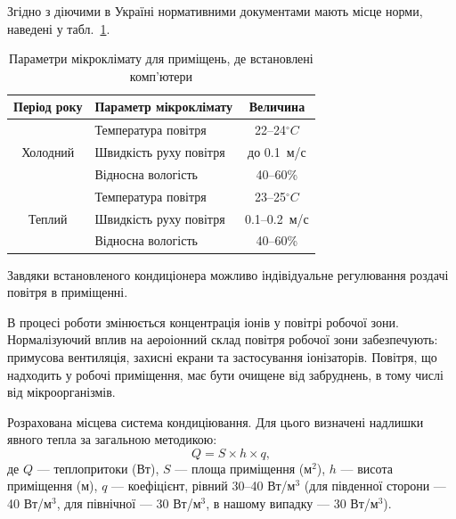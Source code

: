 \documentclass[simple,14pt,utf8,ukrainian]{eskdtext}
\begin{document}
      Згідно з діючими в Україні нормативними документами\cite{gost121005}
      мають місце норми, наведені у табл.~\ref{tab:microclimat}.
      \begin{table}[h]
        \centering
        \begin{tabular}{|c|l|c|}
          \hline
            Період року & Параметр мікроклімату & Величина\\
          \hline
            \multirow{3}{*}{Холодний} & Температура повітря &
            \num{22}--\num{24}$^\circ C$\\
          \cline{2-3}
            & Швидкість руху повітря & до \num{0.1}~м/с\\
          \cline{2-3}
            & Відносна вологість & \num{40}--\num{60}\%\\
          \hline
            \multirow{3}{*}{Теплий} & Температура повітря &
            \num{23}--\num{25}$^\circ C$\\
          \cline{2-3}
            & Швидкість руху повітря & \num{0.1}--\num{0.2}~м/с\\
          \cline{2-3}
            & Відносна вологість & \num{40}--\num{60}\%\\
          \hline
        \end{tabular}
        \caption{Параметри мікроклімату для приміщень, де встановлені
        комп’ютери}
        \label{tab:microclimat}
      \end{table}

      Завдяки встановленого кондиціонера можливо індівідуальне регулювання
      роздачі повітря в приміщенні.

      В процесі роботи змінюється концентрація іонів у повітрі робочої зони.
      Нормалізуючий вплив на аероіонний склад повітря робочої зони
      забезпечують: примусова вентиляція, захисні екрани та застосування
      іонізаторів.
      Повітря, що надходить у робочі приміщення, має бути очищене від
      забруднень, в тому числі від мікроорганізмів.

      Розрахована місцева система кондиціювання. Для цього визначені надлишки
      явного тепла за загальною методикою:
      \begin{equation}
        Q = S \times h \times q,
        \label{eq:nadlishki}
      \end{equation}
      де $Q$ --- теплопритоки (Вт), $S$ --- площа приміщення (м$^2$), $h$ ---
      висота приміщення (м), $q$ --- коефіцієнт, рівний \num{30}--\num{40}
      Вт/м$^3$ (для південної сторони --- 40 Вт/м$^3$, для північної --- 30
      Вт/м$^3$, в нашому випадку --- 30 Вт/м$^3$).
\end{document}
